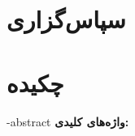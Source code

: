 \cleardoublepage
\thispagestyle{empty}
\section*{سپاس‌گزاری}
\null\vfill
\cleardoublepage
{}
\pagestyle{style2}
\section*{\centering چکیده}
\ffa-abstract
\vspace*{2cm}
\noindent\textbf{واژه‌های کلیدی:}
\par\fkeywords
\null\vfill
\cleardoublepage

